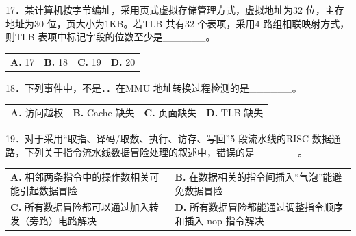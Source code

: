 \documentclass[UTF8,11pt]{ctexart}
\begin{document}
17．某计算机按字节编址，采用页式虚拟存储管理方式，虚拟地址为32 位，主存地址为30 位，页大小为1KB。若TLB 共有32 个表项，采用4 路组相联映射方式，则TLB 表项中标记字段的位数至少是\_\_\_\_\_\_。


\begin{center}\begin{tabular}{>{\raggedright\arraybackslash}p{\dimexpr(\linewidth-8\tabcolsep)/4\relax}>{\raggedright\arraybackslash}p{\dimexpr(\linewidth-8\tabcolsep)/4\relax}>{\raggedright\arraybackslash}p{\dimexpr(\linewidth-8\tabcolsep)/4\relax}>{\raggedright\arraybackslash}p{\dimexpr(\linewidth-8\tabcolsep)/4\relax}}
\textbf{A.} 17 & \textbf{B.} 18 & \textbf{C.} 19 & \textbf{D.} 20\\[.35em]\end{tabular}\end{center}

18．下列事件中，不是．．在MMU 地址转换过程检测的是\_\_\_\_\_\_。


\begin{center}\begin{tabular}{>{\raggedright\arraybackslash}p{\dimexpr(\linewidth-8\tabcolsep)/4\relax}>{\raggedright\arraybackslash}p{\dimexpr(\linewidth-8\tabcolsep)/4\relax}>{\raggedright\arraybackslash}p{\dimexpr(\linewidth-8\tabcolsep)/4\relax}>{\raggedright\arraybackslash}p{\dimexpr(\linewidth-8\tabcolsep)/4\relax}}
\textbf{A.} 访问越权 & \textbf{B.} Cache 缺失 & \textbf{C.} 页面缺失 & \textbf{D.} TLB 缺失\\[.35em]\end{tabular}\end{center}

19．对于采用“取指、译码/取数、执行、访存、写回”5 段流水线的RISC 数据通路，下列关于指令流水线数据冒险处理的叙述中，错误的是\_\_\_\_\_\_。


\begin{center}\begin{tabular}{>{\raggedright\arraybackslash}p{\dimexpr(\linewidth-4\tabcolsep)/2\relax}>{\raggedright\arraybackslash}p{\dimexpr(\linewidth-4\tabcolsep)/2\relax}}
\textbf{A.} 相邻两条指令中的操作数相关可能引起数据冒险 & \textbf{B.} 在数据相关的指令间插入“气泡”能避免数据冒险\\[.35em]
\textbf{C.} 所有数据冒险都可以通过加入转发（旁路）电路解决 & \textbf{D.} 所有数据冒险都能通过调整指令顺序和插入 nop 指令解决\\[.35em]\end{tabular}\end{center}
\end{document}
